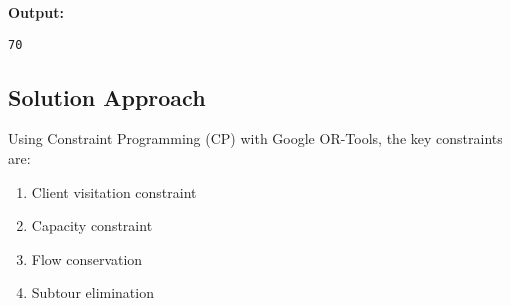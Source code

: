 \documentclass{article}
\begin{document}
\textbf{Output:}
\begin{verbatim}
70
\end{verbatim}

\subsection{Solution Approach}
Using Constraint Programming (CP) with Google OR-Tools, the key constraints are:
\begin{enumerate}
    \item Client visitation constraint
    \item Capacity constraint
    \item Flow conservation
    \item Subtour elimination
\end{enumerate}
\end{document}
